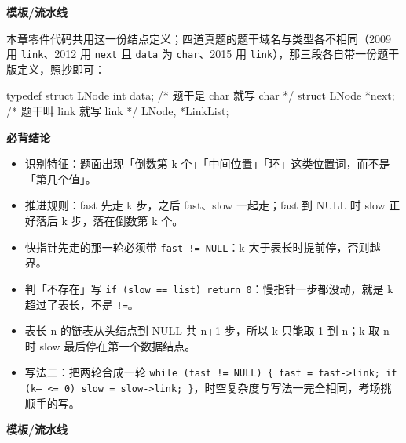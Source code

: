 \documentclass[10pt,a4paper]{ctexart}
\begin{document}
\textbf{模板/流水线}

本章零件代码共用这一份结点定义；四道真题的题干域名与类型各不相同（2009 用 \texttt{link}、2012 用 \texttt{next} 且 \texttt{data} 为 \texttt{char}、2015 用 \texttt{link}），那三段各自带一份题干版定义，照抄即可：

\begin{codebox}
typedef struct LNode {
    int data;                    /* 题干是 char 就写 char */
    struct LNode *next;          /* 题干叫 link 就写 link */
} LNode, *LinkList;
\end{codebox}




\textbf{必背结论}

\begin{itemize}

\item 识别特征：题面出现「倒数第 k 个」「中间位置」「环」这类位置词，而不是「第几个值」。

\item 推进规则：fast 先走 k 步，之后 fast、slow 一起走；fast 到 NULL 时 slow 正好落后 k 步，落在倒数第 k 个。

\item 快指针先走的那一轮必须带 \texttt{fast != NULL}：k 大于表长时提前停，否则越界。

\item 判「不存在」写 \texttt{if (slow == list) return 0}：慢指针一步都没动，就是 k 超过了表长，不是 \texttt{!=}。

\item 表长 n 的链表从头结点到 NULL 共 n+1 步，所以 k 只能取 1 到 n；k 取 n 时 slow 最后停在第一个数据结点。

\item 写法二：把两轮合成一轮 \texttt{while (fast != NULL) \{ fast = fast->link; if (k-- <= 0) slow = slow->link; \}}，时空复杂度与写法一完全相同，考场挑顺手的写。

\end{itemize}

\textbf{模板/流水线}
\end{document}
